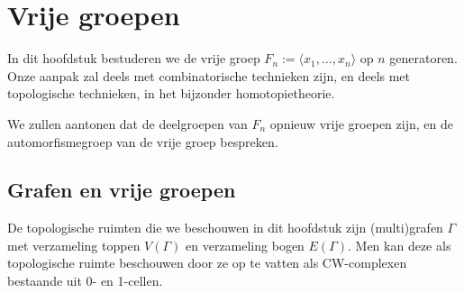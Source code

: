 \documentclass[12pt]{book}
\newcommand{\B}{\rule{1mm}{0mm} \hfill $\Box$ }
\newtheorem{opmh}[stelh]{$\!\!$}
\newenvironment{opm}{\begin{opmh}{\em {\bf Opmerking }}}{\end{opmh}}
\begin{document}
%
%
%
%
%
%
%
%   
%
% 
%
%     



  


%
%
%

\chapter{Vrije groepen}

In dit hoofdstuk bestuderen we de vrije groep $F_n := \langle x_1, \dots , x_n \rangle$ op $n$ generatoren. Onze aanpak zal deels met combinatorische technieken zijn, en deels met topologische technieken, in het bijzonder homotopietheorie.

We zullen aantonen dat de deelgroepen van $F_n$ opnieuw vrije groepen zijn, en de automorfismegroep van de vrije groep bespreken.

\section{Grafen en vrije groepen}

De topologische ruimten die we beschouwen in dit hoofdstuk zijn (multi)grafen $\Gamma$ met verzameling toppen $V(\Gamma)$ en verzameling bogen $E(\Gamma)$. Men kan deze als topologische ruimte beschouwen door ze op te vatten als CW-complexen bestaande uit 0- en 1-cellen.
\end{document}
